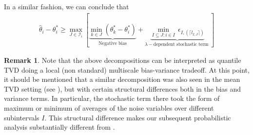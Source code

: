 \documentclass[11pt]{article}
\newcommand{\I}{\mathcal{I}}
\theoremstyle{plain}
\theoremstyle{definition}
\newtheorem{remark}{Remark}
\theoremstyle{remark}
\begin{document}
In a similar fashion, we can conclude that
\begin{align}\label{eqn:bias_sd_2}
  \hat{\theta}_i-\theta^*_i\geq  \max_{J \in \I_i}\left[\underbrace{\min_{k \in J} (\theta^*_k-\theta^*_i)}_{\text{ Negative bias }}+\underbrace{\min_{I\subseteq J: i \in I}\,\epsilon_{I,(\lceil l_{I,J}\rceil)}}_{\lambda-\text{dependent stochastic term }}\right] 
\end{align}

\begin{remark}
    Note that the above decompositions can be interpreted as quantile TVD doing a local (non standard) multiscale bias-variance tradeoff. At this point, it should be mentioned that a similar decomposition was also seen in the mean TVD setting (see \cite{chatterjee2026minmaxtrendfilteringgeneralizations}), but with certain structural differences both in the bias and variance terms. In particular, the stochastic term there took the form of maximum or minimum of averages of the noise variables over different subintervals $I$. This structural difference makes our subsequent probabilistic analysis substantially different from \cite{chatterjee2026minmaxtrendfilteringgeneralizations}.
\end{remark}
\end{document}
